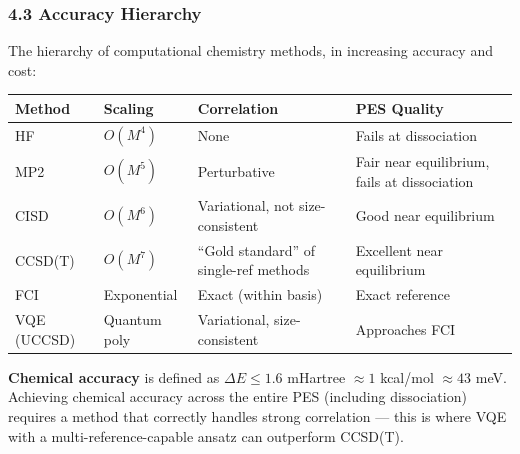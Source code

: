 \documentclass[
  11pt,
]{report}
\newcounter{none} %
\begin{document}
\subsubsection{4.3 Accuracy Hierarchy}\label{accuracy-hierarchy}

The hierarchy of computational chemistry methods, in increasing accuracy
and cost:

{\def\LTcaptype{none} %
\begin{longtable}[]{@{}
  >{\raggedright\arraybackslash}p{}
  >{\centering\arraybackslash}p{}
  >{\centering\arraybackslash}p{}
  >{\centering\arraybackslash}p{}@{}}
\toprule\noalign{}
\begin{minipage}[b]{\linewidth}\raggedright
Method
\end{minipage} & \begin{minipage}[b]{\linewidth}\centering
Scaling
\end{minipage} & \begin{minipage}[b]{\linewidth}\centering
Correlation
\end{minipage} & \begin{minipage}[b]{\linewidth}\centering
PES Quality
\end{minipage} \\
\midrule\noalign{}
\endhead
\bottomrule\noalign{}
\endlastfoot
HF & \(O(M^4)\) & None & Fails at dissociation \\
MP2 & \(O(M^5)\) & Perturbative & Fair near equilibrium, fails at
dissociation \\
CISD & \(O(M^6)\) & Variational, not size-consistent & Good near
equilibrium \\
CCSD(T) & \(O(M^7)\) & ``Gold standard'' of single-ref methods &
Excellent near equilibrium \\
FCI & Exponential & Exact (within basis) & Exact reference \\
VQE (UCCSD) & Quantum poly & Variational, size-consistent & Approaches
FCI \\
\end{longtable}
}

\textbf{Chemical accuracy} is defined as \(\Delta E \leq 1.6\) mHartree
\(\approx 1\) kcal/mol \(\approx 43\) meV. Achieving chemical accuracy
across the entire PES (including dissociation) requires a method that
correctly handles strong correlation --- this is where VQE with a
multi-reference-capable ansatz can outperform CCSD(T).
\end{document}
